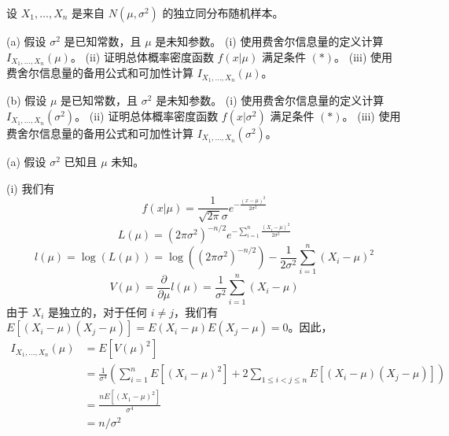 \begin{questions}

\question 设 $X_1, \dots, X_n$ 是来自 $N(\mu, \sigma^2)$ 的独立同分布随机样本。

(a) 假设 $\sigma^2$ 是已知常数，且 $\mu$ 是未知参数。
(i) 使用费舍尔信息量的定义计算 $I_{X_1, \dots, X_n}(\mu)$。
(ii) 证明总体概率密度函数 $f(x|\mu)$ 满足条件 $(*)$。
(iii) 使用费舍尔信息量的备用公式和可加性计算 $I_{X_1, \dots, X_n}(\mu)$。

(b) 假设 $\mu$ 是已知常数，且 $\sigma^2$ 是未知参数。
(i) 使用费舍尔信息量的定义计算 $I_{X_1, \dots, X_n}(\sigma^2)$。
(ii) 证明总体概率密度函数 $f(x|\sigma^2)$ 满足条件 $(*)$。
(iii) 使用费舍尔信息量的备用公式和可加性计算 $I_{X_1, \dots, X_n}(\sigma^2)$。

\begin{solution}
(a) 假设 $\sigma^2$ 已知且 $\mu$ 未知。

(i) 我们有
\[
f(x|\mu) = \frac{1}{\sqrt{2\pi}\sigma} e^{-\frac{(x-\mu)^2}{2\sigma^2}}
\]
\[
L(\mu) = \left(2\pi\sigma^2\right)^{-n/2} e^{-\sum_{i=1}^n \frac{(X_i-\mu)^2}{2\sigma^2}}
\]
\[
l(\mu) = \log(L(\mu)) = \log\left((2\pi\sigma^2)^{-n/2}\right) - \frac{1}{2\sigma^2} \sum_{i=1}^n (X_i-\mu)^2
\]
\[
V(\mu) = \frac{\partial}{\partial \mu} l(\mu) = \frac{1}{\sigma^2} \sum_{i=1}^n (X_i-\mu)
\]
由于 $X_i$ 是独立的，对于任何 $i \neq j$，我们有 $E[(X_i-\mu)(X_j-\mu)] = E(X_i-\mu) E(X_j-\mu) = 0$。因此，
\begin{align*}
I_{X_1, \dots, X_n}(\mu) &= E[V(\mu)^2] \\
&= \frac{1}{\sigma^4} \left(\sum_{i=1}^n E[(X_i-\mu)^2] + 2 \sum_{1 \le i < j \le n} E[(X_i-\mu)(X_j-\mu)]\right) \\
&= \frac{n E[(X_1-\mu)^2]}{\sigma^4} \\
&= n/\sigma^2
\end{align*}


\end{solution}
\end{questions}
